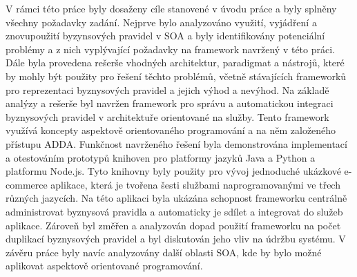 V rámci této práce byly dosaženy cíle stanovené v úvodu práce a byly splněny všechny
požadavky zadání. Nejprve bylo analyzováno využití, vyjádření a znovupoužití
byzynsových pravidel v \gls{SOA} a byly identifikovány potenciální problémy a z nich vyplývající požadavky
na framework navržený v této práci. Dále byla provedena rešerše vhodných architektur,
paradigmat a nástrojů, které by mohly být použity pro řešení těchto problémů, včetně stávajících
frameworků pro reprezentaci byznysových pravidel a jejich výhod a nevýhod. Na základě analýzy a
rešerše byl navržen framework pro správu a automatickou integraci byznysových pravidel
v architektuře orientované na služby. Tento framework využívá koncepty aspektově orientovaného programování
a na něm založeného přístupu \gls{ADDA}. Funkčnost navrženého řešení byla demonstrována implementací a
otestováním prototypů knihoven pro platformy jazyků Java a Python a platformu Node.js. Tyto knihovny byly
použity pro vývoj jednoduché ukázkové e-commerce aplikace, která je tvořena šesti službami naprogramovanými
ve třech různých jazycích. Na této aplikaci byla ukázána schopnost frameworku centrálně administrovat byznysová
pravidla a automaticky je sdílet a integrovat do služeb aplikace. Zároveň byl změřen a analyzován
dopad použití frameworku na počet duplikací byznysových pravidel a byl diskutován jeho vliv na
údržbu systému. V závěru práce byly navíc analyzovány další oblasti \gls{SOA}, kde by bylo možné aplikovat
aspektově orientované programování.
